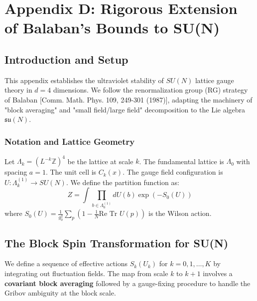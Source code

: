 \chapter{Appendix D: Rigorous Extension of Balaban's Bounds to SU(N)}
\label{app:appendix_D_balaban_sun}

\section{Introduction and Setup}

This appendix establishes the ultraviolet stability of $SU(N)$ lattice gauge theory in $d=4$ dimensions. We follow the renormalization group (RG) strategy of Balaban [Comm. Math. Phys. 109, 249-301 (1987)], adapting the machinery of "block averaging" and "small field/large field" decomposition to the Lie algebra $\mathfrak{su}(N)$.

\subsection{Notation and Lattice Geometry}

Let $\Lambda_k = (L^{-k} \mathbb{Z})^4$ be the lattice at scale $k$. The fundamental lattice is $\Lambda_0$ with spacing $a=1$. The unit cell is $C_k(x)$.
The gauge field configuration is $U: \Lambda_k^{(1)} \to SU(N)$.
We define the partition function as:
\begin{equation}
Z = \int \prod_{b \in \Lambda_0^{(1)}} dU(b) \exp(-S_0(U))
\end{equation}
where $S_0(U) = \frac{1}{g_0^2} \sum_p (1 - \frac{1}{N} \text{Re Tr } U(p))$ is the Wilson action.

\section{The Block Spin Transformation for SU(N)}

We define a sequence of effective actions $S_k(U_k)$ for $k=0, 1, \dots, K$ by integrating out fluctuation fields. The map from scale $k$ to $k+1$ involves a \textbf{covariant block averaging} followed by a gauge-fixing procedure to handle the Gribov ambiguity at the block scale.

